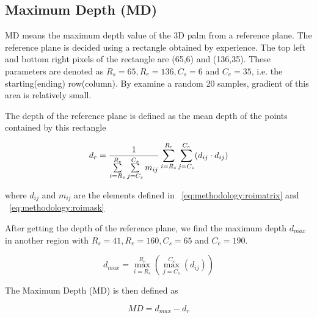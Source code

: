 \subsection{Maximum Depth (MD)}
\label{ssec:methodology:md}

MD means the maximum depth value of the 3D palm from a reference plane. The reference plane is decided using a rectangle obtained by experience. The top left and bottom right pixels of the rectangle are (65,6) and (136,35). These parameters are denoted as $R_s=65, R_e=136, C_s=6$ and $C_e=35$, i.e. the starting(ending) row(column). By examine a random 20 samples, gradient of this area is relatively small.

The depth of the reference plane is defined as the mean depth of the points contained by this rectangle

\begin{equation}
d_r = {1\over{
    \sum \limits_{i=R_s}^{R_e} \sum \limits_{j=C_s}^{C_e} m_{ij}
}}
\sum \limits_{i=R_s}^{R_e} \sum \limits_{j=C_s}^{C_e} (d_{ij} \cdot d_{ij})
\end{equation}

where $d_{ij}$ and $m_{ij}$ are the elements defined in ~\ref{eq:methodology:roimatrix} and ~\ref{eq:methodology:roimask}

After getting the depth of the reference plane, we find the maximum depth $d_{max}$ in another region with $R_s=41, R_e=160, C_s=65$ and $C_e=190$.

\begin{equation}
d_{max} = \max \limits_{i=R_s}^{R_e} (\max \limits_{j=C_s}^{C_e} (d_{ij}) )
\end{equation}


The Maximum Depth (MD) is then defined as

\begin{equation}
\label{eq:methodology:md}
MD= d_{max} - d_r
\end{equation}